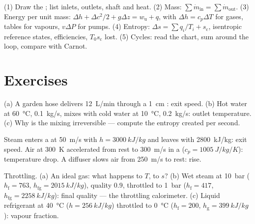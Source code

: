 \begin{method}\label{meth:b2:open-systems:method}
(1) Draw the ; list inlets, outlets, shaft and heat.
(2) Mass: $\sum\dot m_{\text{in}} = \sum\dot m_{\text{out}}$. (3) Energy
per unit mass: $\Delta h + \Delta c^2/2 + g\Delta z = w_{\text{u}} + q$, with
$\Delta h = c_p\Delta T$ for gases, tables for vapours, $v\Delta P$ for
pumps. (4) Entropy: $\Delta s = \sum q_i/T_i + s_{\text{c}}$, isentropic
reference states, efficiencies, $T_0s_{\text{c}}$ lost. (5) Cycles: read
the chart, sum around the loop, compare with Carnot.
\end{method}

\section{Exercises}

\begin{exercise}[$\star$]\label{exo:b2:open-systems:1}
(a) A garden hose delivers \qty{12}{L/min} through a \qty{1}{cm}
: exit speed. (b) Hot water at \qty{60}{\celsius}, \qty{0.1}{kg/s},
mixes with cold water at \qty{10}{\celsius}, \qty{0.2}{kg/s}: outlet
temperature. (c) Why is the mixing irreversible --- compute the
entropy created per second.
\end{exercise}

\begin{exercise}[$\star$]\label{exo:b2:open-systems:2}
Steam enters a  at \qty{50}{m/s} with $h = \qty{3000}{kJ/kg}$ and
leaves with \qty{2800}{kJ/kg}: exit speed. Air at \qty{300}{K} accelerated
from rest to \qty{300}{m/s} in a  ($c_p = \qty{1005}{J/kg/K}$):
temperature drop. A diffuser slows air from \qty{250}{m/s} to rest: rise.
\end{exercise}

\begin{exercise}[$\star$]\label{exo:b2:open-systems:3}
Throttling. (a) An ideal gas: what happens to $T$, to $s$? (b) Wet steam
at \qty{10}{bar} ($h_{\text{f}} = 763$, $h_{\text{fg}} = \qty{2015}{kJ/kg}$),
quality $0.9$, throttled to \qty{1}{bar} ($h_{\text{f}} = 417$, $h_{\text{fg}}
= \qty{2258}{kJ/kg}$): final quality --- the throttling calorimeter. (c)
Liquid refrigerant at \qty{40}{\celsius} ($h = \qty{256}{kJ/kg}$) throttled
to \qty{0}{\celsius} ($h_{\text{f}} = 200$, $h_{\text{g}} = \qty{399}{kJ/kg}$):
vapour fraction.
\end{exercise}

